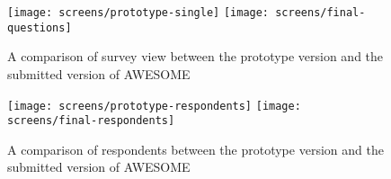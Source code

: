 	\begin{figure}[h]
		\texttt{[image: screens/prototype-single]}
		\texttt{[image: screens/final-questions]}
		\caption{A comparison of survey view between the prototype version and the submitted version of \acs{AWESOME}}
		\label{fig:results-comparison}
	\end{figure}
	
	\begin{figure}[h]
		\texttt{[image: screens/prototype-respondents]}
		\texttt{[image: screens/final-respondents]}
		\caption{A comparison of respondents between the prototype version and the submitted version of \acs{AWESOME}}
		\label{fig:results-comparison}
	\end{figure}